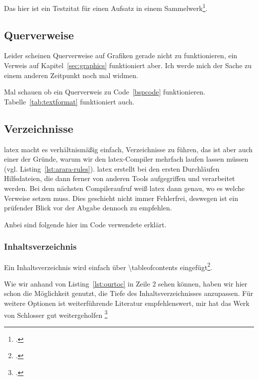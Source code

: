 Das hier ist ein Testzitat für einen Aufsatz in einem Sammelwerk\footcite[][]{billen_peter_kundenbindung_2005}.

\subsection{Querverweise}
\label{sec:refs}
Leider scheinen Querverweise auf Grafiken gerade nicht zu funktionieren, ein Verweis auf Kapitel~\ref{sec:graphics} funktioniert aber. Ich werde mich der Sache zu einem anderen Zeitpunkt noch mal widmen.

Mal schauen ob ein Querverweis zu Code~\ref{bspcode} funktionieren. Tabelle~\ref{tab:textformat} funktioniert auch.

\subsection{Verzeichnisse}
\label{sec:catalogs}
\gls{latex} macht es verhältnismäßig einfach, Verzeichnisse zu führen, das ist aber auch einer der Gründe, warum wir den \gls{latex}-Compiler mehrfach laufen lassen müssen (vgl. Listing~\ref{lst:arara-rules}). \gls{latex} erstellt bei den ersten Durchläufen Hilfsdateien, die dann ferner von anderen Tools aufgegriffen und verarbeitet werden. Bei dem nächsten Compileraufruf weiß \gls{latex} dann genau, wo es welche Verweise setzen muss. Dies geschieht nicht immer Fehlerfrei, deswegen ist ein prüfender Blick vor der Abgabe dennoch zu empfehlen.


Anbei sind folgende hier im Code verwendete erklärt.

\subsubsection{Inhaltsverzeichnis}
\label{sec:toc}
Ein Inhaltsverzeichnis wird einfach über \textbackslash tableofcontents eingefügt\footcite[Vgl. ][S. 7ff]{ochsnerTextverarbeitungssystemLaTeXPraktische2015}.



Wie wir anhand von Listing~\ref{lst:ourtoc} in Zeile 2 sehen können, haben wir hier schon die Möglichkeit genutzt, die Tiefe des Inhaltsverzeichnisses anzupassen. Für weitere Optionen ist weiterführende Literatur empfehlenswert, mir hat das Werk von Schlosser gut weitergeholfen \footcite[Vgl. ][S. 207ff.]{schlosserWissenschaftlicheArbeitenSchreiben2014}

